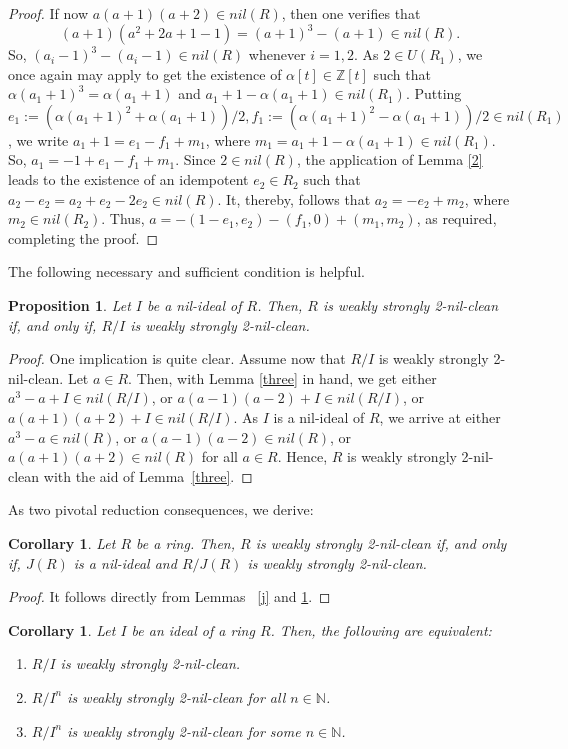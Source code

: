 \documentclass[12pt]{amsart}
\newtheorem{proposition}[theorem]{Proposition}
\newtheorem{corollary}[theorem]{Corollary}
\theoremstyle{definition}
\begin{document}
\begin{proof}
If now $a(a+1)(a+2)\in nil(R)$, then one verifies that $$(a+1)(a^2+2a+1-1)=(a+1)^3-(a+1)\in nil(R).$$ So, $(a_i-1)^3-(a_i-1)\in nil(R)$ whenever $i=1,2$. As $2\in U(R_1)$, we once again may apply \cite[Lemma 2.6]{zhou} to get the existence of $\alpha[t]\in \mathbb{Z}[t]$ such that $\alpha(a_1+1)^3=\alpha(a_1+1)$ and $a_1+1-\alpha(a_1+1)\in nil(R_1)$. Putting $e_1:=(\alpha(a_1+1)^2+\alpha(a_1+1))/2,f_1:=(\alpha(a_1+1)^2-\alpha(a_1+1))/2\in nil(R_1)$, we write $a_1+1=e_1-f_1+m_1$, where $m_1=a_1+1-\alpha(a_1+1)\in nil(R_1)$. So, $a_1=-1+e_1-f_1+m_1$. Since $2\in nil(R)$, the application of Lemma \ref{2} leads to the existence of an idempotent $e_2\in R_2$ such that $a_2-e_2=a_2+e_2-2e_2\in nil(R)$. It, thereby, follows that $a_2=-e_2+m_2$, where $m_2 \in nil(R_2)$. Thus, $a=-(1-e_1,e_2)-(f_1,0)+(m_1,m_2)$, as required, completing the proof.
\end{proof}

The following necessary and sufficient condition is helpful.

\begin{proposition}\label{11} Let $I$ be a nil-ideal of $R$. Then, $R$ is weakly strongly 2-nil-clean if, and only if, $R/I$ is weakly strongly 2-nil-clean.
\end{proposition}

\begin{proof} One implication is quite clear. Assume now that $R/I$ is weakly strongly 2-nil-clean. Let $a\in R$. Then, with Lemma \ref{three} in hand, we get either $a^3-a+I\in nil(R/I)$, or $a(a-1)(a-2)+I\in nil(R/I)$, or $a(a+1)(a+2)+I\in nil(R/I)$. As $I$ is a nil-ideal of $R$, we arrive at either $a^3-a\in nil(R)$, or $a(a-1)(a-2)\in nil(R)$, or $a(a+1)(a+2)\in nil(R)$ for all $a\in R$. Hence, $R$ is weakly strongly 2-nil-clean with the aid of Lemma~\ref{three}.
\end{proof}

As two pivotal reduction consequences, we derive:

\begin{corollary}\label{fac} Let $R$ be a ring. Then, $R$ is weakly strongly 2-nil-clean if, and only if, $J(R)$ is a nil-ideal and $R/J(R)$ is weakly strongly 2-nil-clean.
\end{corollary}

\begin{proof} It follows directly from Lemmas~ \ref{j} and \ref{11}.
\end{proof}

\begin{corollary}\label{10}
Let $I$ be an ideal of a ring $R$. Then, the following are equivalent:
\begin{enumerate}
\item
$R/I$ is weakly strongly 2-nil-clean.
\item
$R/I^n$	is weakly strongly 2-nil-clean for all $n \in \mathbb{N}$.
\item
$R/I^n$ is weakly strongly 2-nil-clean for some $n \in \mathbb{N}$.
\end{enumerate}	
\end{corollary}
\end{document}
